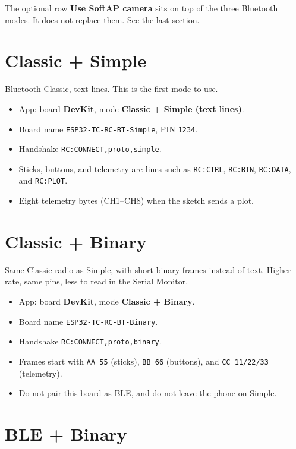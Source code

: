 \documentclass[12pt,a4paper]{article}
\newcommand{\code}[1]{\nolinkurl{#1}}
\newcommand{\ui}[1]{\textsf{\textbf{#1}}}
\begin{document}
The optional row \ui{Use SoftAP camera} sits on top of the three Bluetooth
modes. It does not replace them. See the last section.

\section{Classic + Simple}

Bluetooth Classic, text lines. This is the first mode to use.

\begin{itemize}[leftmargin=1.4cm]
  \item App: board \ui{DevKit}, mode \ui{Classic + Simple (text lines)}.
  \item Board name \code{ESP32-TC-RC-BT-Simple}, PIN \code{1234}.
  \item Handshake \code{RC:CONNECT,proto,simple}.
  \item Sticks, buttons, and telemetry are lines such as \code{RC:CTRL},
        \code{RC:BTN}, \code{RC:DATA}, and \code{RC:PLOT}.
  \item Eight telemetry bytes (CH1--CH8) when the sketch sends a plot.
\end{itemize}

\section{Classic + Binary}

Same Classic radio as Simple, with short binary frames instead of text.
Higher rate, same pins, less to read in the Serial Monitor.

\begin{itemize}[leftmargin=1.4cm]
  \item App: board \ui{DevKit}, mode \ui{Classic + Binary}.
  \item Board name \code{ESP32-TC-RC-BT-Binary}.
  \item Handshake \code{RC:CONNECT,proto,binary}.
  \item Frames start with \code{AA 55} (sticks), \code{BB 66} (buttons),
        and \code{CC 11/22/33} (telemetry).
  \item Do not pair this board as BLE, and do not leave the phone on
        Simple.
\end{itemize}

\section{BLE + Binary}
\end{document}
